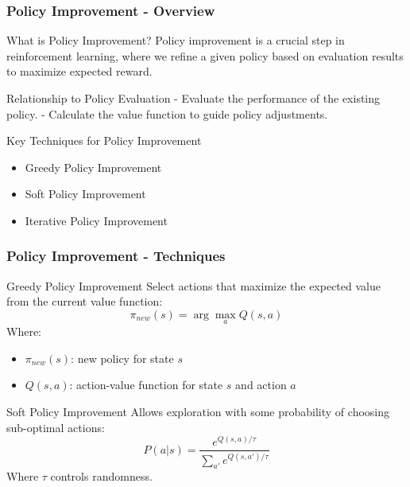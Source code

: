 \documentclass[aspectratio=169]{beamer}
\begin{document}
\begin{frame}[fragile]
    \frametitle{Policy Improvement - Overview}
    \begin{block}{What is Policy Improvement?}
        Policy improvement is a crucial step in reinforcement learning, where we refine a given policy based on evaluation results to maximize expected reward.
    \end{block}

    \begin{block}{Relationship to Policy Evaluation}
        - Evaluate the performance of the existing policy.
        - Calculate the value function to guide policy adjustments.
    \end{block}

    \begin{block}{Key Techniques for Policy Improvement}
        \begin{itemize}
            \item Greedy Policy Improvement
            \item Soft Policy Improvement
            \item Iterative Policy Improvement
        \end{itemize}
    \end{block}
\end{frame}

\begin{frame}[fragile]
    \frametitle{Policy Improvement - Techniques}
    \begin{block}{Greedy Policy Improvement}
        Select actions that maximize the expected value from the current value function:
        \begin{equation}
        \pi_{new}(s) = \arg\max_{a} Q(s, a)
        \end{equation}
        Where:
        \begin{itemize}
            \item \( \pi_{new}(s) \): new policy for state \( s \)
            \item \( Q(s, a) \): action-value function for state \( s \) and action \( a \)
        \end{itemize}
    \end{block}
    
    \begin{block}{Soft Policy Improvement}
        Allows exploration with some probability of choosing sub-optimal actions:
        \begin{equation}
        P(a | s) = \frac{e^{Q(s, a)/\tau}}{\sum_{a'} e^{Q(s, a')/\tau}}
        \end{equation}
        Where \( \tau \) controls randomness.
    \end{block}
\end{frame}
\end{document}
